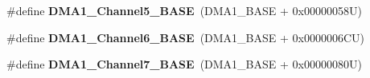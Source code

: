 \begin{DoxyCompactItemize}
\item 
\hypertarget{group___peripheral__memory__map_gac041a71cd6c1973964f847a68aa14478}{\#define {\bfseries D\-M\-A1\-\_\-\-Channel5\-\_\-\-B\-A\-S\-E}~(D\-M\-A1\-\_\-\-B\-A\-S\-E + 0x00000058\-U)}\label{group___peripheral__memory__map_gac041a71cd6c1973964f847a68aa14478}

\item 
\hypertarget{group___peripheral__memory__map_ga896c2c7585dd8bc3969cf8561f689d2d}{\#define {\bfseries D\-M\-A1\-\_\-\-Channel6\-\_\-\-B\-A\-S\-E}~(D\-M\-A1\-\_\-\-B\-A\-S\-E + 0x0000006\-C\-U)}\label{group___peripheral__memory__map_ga896c2c7585dd8bc3969cf8561f689d2d}

\item 
\hypertarget{group___peripheral__memory__map_gaeee0d1f77d0db1db533016a09351166c}{\#define {\bfseries D\-M\-A1\-\_\-\-Channel7\-\_\-\-B\-A\-S\-E}~(D\-M\-A1\-\_\-\-B\-A\-S\-E + 0x00000080\-U)}\label{group___peripheral__memory__map_gaeee0d1f77d0db1db533016a09351166c}


\end{DoxyCompactItemize}
